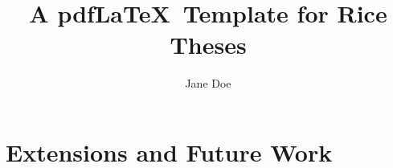 \documentclass[oneside,12pt]{classes/Ricethesis_PDF}
\author{Jane Doe}
\title{A pdf\LaTeX ~Template for Rice Theses}
\def\bibsecname{References}
\begin{document}
\begin{romanpages}

{
\maketitle


\DoubleSpacing
%


%


\setcounter{secnumdepth}{3}
\setcounter{tocdepth}{1}

\OnehalfSpacing
\tableofcontents
\clearpage
\printglossaries
\clearpage
\listoffigures
\clearpage
\listoftables
\clearpage
}
\end{romanpages}

\DoubleSpacing

{


%
%
\chapter{Extensions and Future Work}




\SingleSpacing
\cleardoublepage
\renewcommand{\bibname}{\bibsecname}

}
\end{document}
